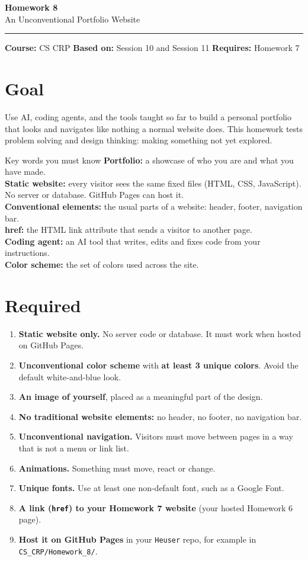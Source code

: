 \documentclass[11pt]{article}
\newcommand{\hw}[2]{{\Large\bfseries\color{navy} #1}\\[2pt]{\large #2}\\[-4pt]\rule{\textwidth}{1.2pt}}
\begin{document}
\hw{Homework 8}{An Unconventional Portfolio Website}
\textbf{Course:} CS CRP \quad \textbf{Based on:} Session 10 and Session 11 \quad \textbf{Requires:} Homework 7

\section*{Goal}
Use AI, coding agents, and the tools taught so far to build a personal portfolio that looks and navigates like nothing a normal website does. This homework tests problem solving and design thinking: making something not yet explored.

\begin{term}{Key words you must know}
\textbf{Portfolio:} a showcase of who you are and what you have made.\\
\textbf{Static website:} every visitor sees the same fixed files (HTML, CSS, JavaScript). No server or database. GitHub Pages can host it.\\
\textbf{Conventional elements:} the usual parts of a website: header, footer, navigation bar.\\
\textbf{href:} the HTML link attribute that sends a visitor to another page.\\
\textbf{Coding agent:} an AI tool that writes, edits and fixes code from your instructions.\\
\textbf{Color scheme:} the set of colors used across the site.
\end{term}

\section*{Required}
\begin{enumerate}[leftmargin=*]
\item \textbf{Static website only.} No server code or database. It must work when hosted on GitHub Pages.
\item \textbf{Unconventional color scheme} with \textbf{at least 3 unique colors}. Avoid the default white-and-blue look.
\item \textbf{An image of yourself}, placed as a meaningful part of the design.
\item \textbf{No traditional website elements:} no header, no footer, no navigation bar.
\item \textbf{Unconventional navigation.} Visitors must move between pages in a way that is not a menu or link list.
\item \textbf{Animations.} Something must move, react or change.
\item \textbf{Unique fonts.} Use at least one non-default font, such as a Google Font.
\item \textbf{A link (\texttt{href}) to your Homework 7 website} (your hosted Homework 6 page).
\item \textbf{Host it on GitHub Pages} in your \texttt{Heuser} repo, for example in \texttt{CS\_CRP/Homework\_8/}.
\end{enumerate}
\end{document}

